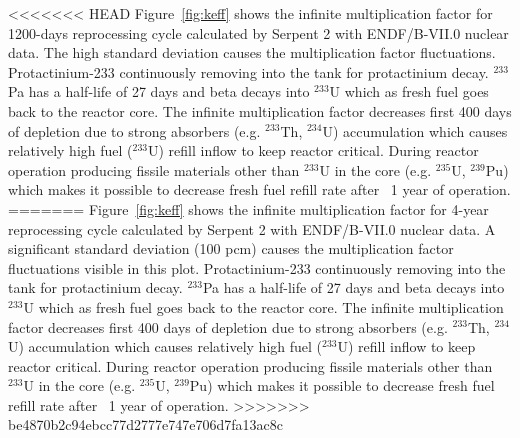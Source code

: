 \documentclass{anstrans}
\begin{document}
<<<<<<< HEAD
Figure~\ref{fig:keff} shows the infinite multiplication factor for 1200-days
reprocessing cycle calculated by Serpent 2 with ENDF/B-VII.0 nuclear data. The 
high standard deviation causes the multiplication factor fluctuations. 
Protactinium-233 continuously removing into the tank for protactinium decay. 
$^{233}$Pa has a half-life of 27 days and beta decays into $^{233}$U which as 
fresh fuel goes back to the reactor core. The infinite multiplication factor 
decreases first 400 days of depletion due to strong absorbers (e.g. $^{233}$Th, 
$^{234}$U) accumulation which causes relatively high fuel ($^{233}$U) refill 
inflow to keep reactor critical. During reactor operation producing fissile 
materials other than $^{233}$U in the core (e.g. $^{235}$U, $^{239}$Pu) which 
makes it possible to decrease fresh fuel refill rate after ~1 year of 
operation.
=======
Figure~\ref{fig:keff} shows the infinite multiplication factor for 4-year 
reprocessing cycle calculated by Serpent 2 with ENDF/B-VII.0 nuclear data. A 
significant standard deviation (100 pcm) causes the multiplication factor 
fluctuations visible in this plot.  Protactinium-233 continuously removing into 
the tank for protactinium decay.  $^{233}$Pa has a half-life of 27 days and 
beta decays into $^{233}$U which as fresh fuel goes back to the reactor core. 
The infinite multiplication factor decreases first 400 days of depletion due to 
strong absorbers (e.g. $^{233}$Th, $^{234}$U) accumulation which causes 
relatively high fuel ($^{233}$U) refill inflow to keep reactor critical. During 
reactor operation producing fissile materials other than $^{233}$U in the core 
(e.g. $^{235}$U, $^{239}$Pu) which makes it possible to decrease fresh fuel 
refill rate after ~1 year of operation.
>>>>>>> be4870b2c94ebcc77d2777e747e706d7fa13ac8c
\end{document}
